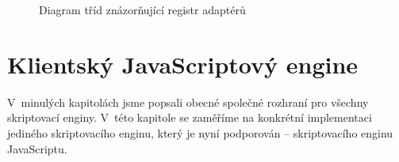 \begin{figure}[H]
  \begin{center}
    \caption{Diagram tříd znázorňující registr adaptérů}
    \label{Figure.AdapterRegistry}
  \end{center}
\end{figure}

\vspace{-1em}

\section{Klientský JavaScriptový engine}
\label{Chapter.Implementation.JavaScriptEngine}

V~minulých kapitolách jsme popsali obecné společné rozhraní pro všechny skriptovací enginy. V~této kapitole se zaměříme na konkrétní implementaci jediného skriptovacího enginu, který je nyní podporován -- skriptovacího enginu JavaScriptu.

